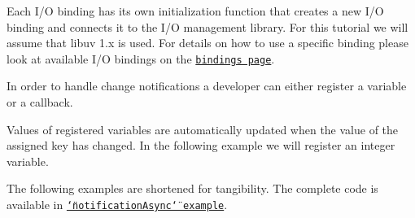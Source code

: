 Each I/O binding has its own initialization function that creates a new I/O binding and connects it to the I/O management library. For this tutorial we will assume that libuv 1.\+x is used. For details on how to use a specific binding please look at available I/O bindings on the \href{https://www.libelektra.org/bindings/readme}{\tt bindings page}.

In order to handle change notifications a developer can either register a variable or a callback.

Values of registered variables are automatically updated when the value of the assigned key has changed. In the following example we will register an integer variable.

The following examples are shortened for tangibility. The complete code is available in \href{https://www.libelektra.org/examples/notificationasync}{\tt \char`\"{}notification\+Async\char`\"{} example}.



